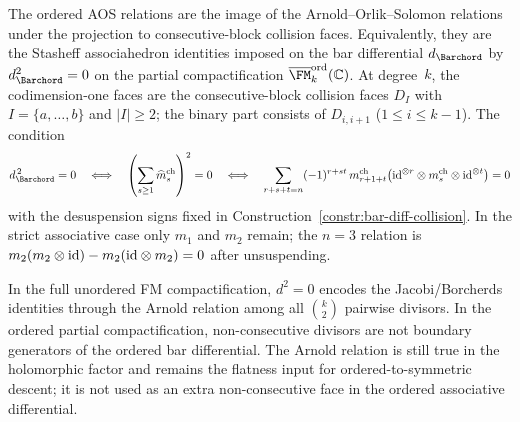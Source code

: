 \begin{theorem}
\ClaimStatusProvedHere
\label{thm:ordered-AOS}
The ordered AOS relations are the image of the Arnold--Orlik--Solomon
relations under the projection to consecutive-block collision faces.
Equivalently, they are the Stasheff associahedron identities imposed on
the bar differential $d_{\Barchord}$ by $d_{\Barchord}^2=0$ on the
partial compactification
$\overline{\FM}_k^{\mathrm{ord}}(\mathbb{C})$. At degree~$k$, the
codimension-one faces are the consecutive-block collision faces
$D_I$ with $I=\{a,\dots,b\}$ and $|I|\ge2$; the binary part consists of
$D_{i,i+1}$ ($1 \leq i \leq k{-}1$).
The condition
\begin{equation}\label{eq:ordered-d-squared}
d_{\Barchord}^{\,2}=0
\quad\Longleftrightarrow\quad
\left(\sum_{s\ge1}\widehat m_s^{\mathrm{ch}}\right)^2=0
\quad\Longleftrightarrow\quad
\sum_{r+s+t=n}
(-1)^{r+st}\,
m_{r+1+t}^{\mathrm{ch}}
\bigl(\id^{\otimes r}\otimes m_s^{\mathrm{ch}}
\otimes\id^{\otimes t}\bigr)
=0
\end{equation}
with the desuspension signs fixed in
Construction~\ref{constr:bar-diff-collision}. In the strict
associative case only $m_1$ and $m_2$ remain; the $n=3$ relation is
$m_2(m_2\otimes\mathrm{id})-m_2(\mathrm{id}\otimes m_2)=0$ after unsuspending.

In the full unordered FM compactification, $d^2 = 0$ encodes the
Jacobi/Borcherds identities through the Arnold relation among all
$\binom{k}{2}$ pairwise divisors. In the ordered partial
compactification, non-consecutive divisors are not boundary generators
of the ordered bar differential. The Arnold relation is still true in
the holomorphic factor and remains the flatness input for
ordered-to-symmetric descent; it is not used as an extra
non-consecutive face in the ordered associative differential.
\end{theorem}

